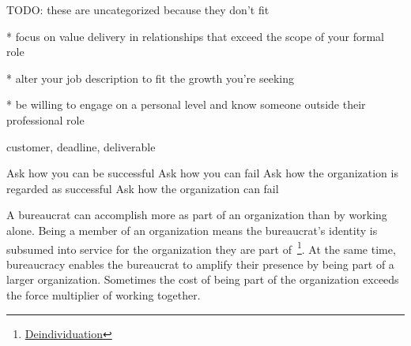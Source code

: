 TODO: these are uncategorized because they don't fit 


* focus on value delivery in relationships that exceed the scope of your formal role

* alter your job description to fit the growth you're seeking

* be willing to engage on a personal level and know someone outside their professional role


customer, deadline, deliverable

Ask how you can be successful
Ask how you can fail
Ask how the organization is regarded as successful
Ask how the organization can fail





A bureaucrat can accomplish more as part of an organization than by working alone. Being a member of an organization means the bureaucrat's identity is subsumed into service for the organization they are part of~\footnote{\href{https://en.wikipedia.org/wiki/Deindividuation}{Deindividuation}}. At the same time, bureaucracy enables the bureaucrat to amplify their presence by being part of a larger organization.  Sometimes the cost of being part of the organization exceeds the force multiplier of working together. 

